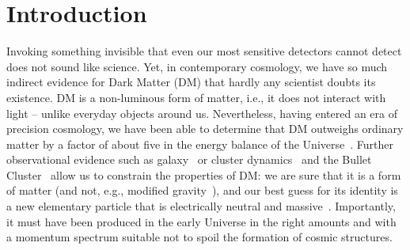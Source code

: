 \section{\label{sec:Introduction}Introduction}

Invoking something invisible that even our most sensitive detectors cannot detect does not sound like science. Yet, in contemporary cosmology, we have so much indirect evidence for Dark Matter (DM) that hardly any scientist doubts its existence. DM is a non-luminous form of matter, i.e., it does not interact with light -- unlike everyday objects around us. Nevertheless, having entered an era of precision cosmology, we have been able to determine that DM outweighs ordinary matter by a factor of about five in the energy balance of the Universe~\cite{Planck:2015xua}. Further observational evidence such as galaxy~\cite{Begeman:1991iy} or cluster dynamics~\cite{COMA} and the Bullet Cluster~\cite{Clowe:2006eq} allow us to constrain the properties of DM: we are sure that it is a form of matter (and not, e.g., modified gravity~\cite{Lage:2014yxa}), and our best guess for its identity is a new elementary particle that is electrically neutral and massive~\cite{Bertone:2004pz}. Importantly, it must have been produced in the early Universe in the right amounts and with a momentum spectrum suitable not to spoil the formation of cosmic structures.

